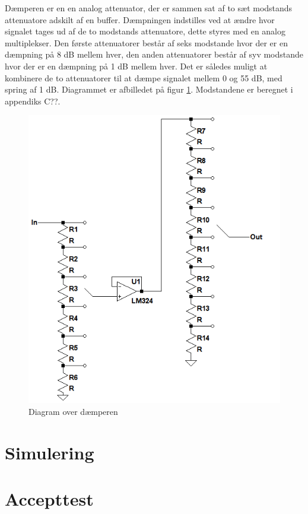 Dæmperen er en en analog attenuator, der er sammen sat af to sæt modstands attenuatore adskilt af en buffer. Dæmpningen indstilles ved at ændre hvor signalet tages ud af de to modstands attenuatore, dette styres med en analog multiplekser. Den første attenuatorer består af seks modstande hvor der er en dæmpning på 8 dB mellem hver, den anden attenuatorer består af syv modstande hvor der er en dæmpning på 1 dB mellem hver. Det er således muligt at kombinere de to attenuatorer til at dæmpe signalet mellem 0 og 55 dB, med spring af 1 dB. Diagrammet er afbilledet på figur \ref{fig:volumenkontrol_daemper}. Modstandene er beregnet i appendiks C??.

\begin{figure}[h]
\centering
\includegraphics[scale=1]{teknisk/volumenkontrol/daemper.png}
\caption{Diagram over dæmperen}
\label{fig:volumenkontrol_daemper}
\end{figure}

\section{Simulering}
\label{volumenkontrol-simulering}

\section{Accepttest}
\label{volumenkontrol-accepttest}

